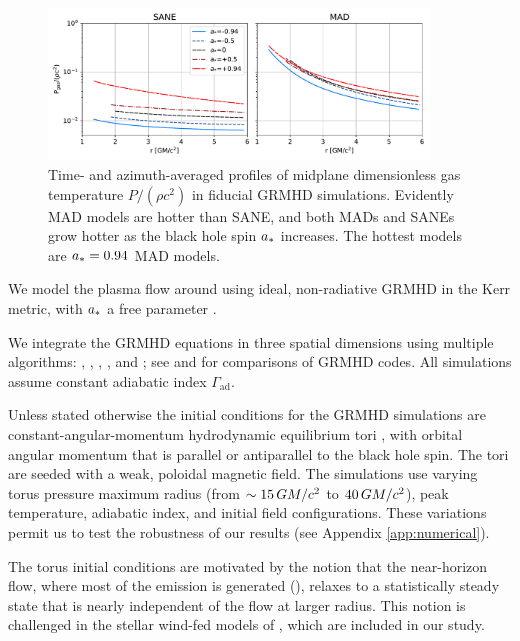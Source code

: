 \begin{figure}
  \centering
  \includegraphics[width=0.9\textwidth]{figures/grmhd_temp.pdf}
  \caption{Time- and azimuth-averaged profiles of midplane dimensionless gas temperature $P/(\rho c^2)$ in \kharma fiducial GRMHD simulations.
    Evidently MAD models are hotter than SANE, and both MADs and SANEs grow hotter as the black hole spin $a_*$ increases.
    The hottest models are $a_* = 0.94$ MAD models.}
  \label{fig:grmhd_temp}
\end{figure}

We model the plasma flow around \sgra using ideal, non-radiative GRMHD in the Kerr metric,
with $a_*$ a free parameter \citep[see e.g.,][]{1999ApJ...522..727K,2001MNRAS.326L..41K,2003ApJ...589..444G, 2003ApJ...589..458D, 2005ApJ...635..723A, 2007A&A...473...11D}.

We integrate the GRMHD equations in three spatial dimensions using multiple algorithms:
\kharma   \citep{2021JOSS....6.3336P},
\bhac     \citep{2017ComAC...4....1P,Olivares2019},
\hamr     \citep{Liska2019},
\koral    \citep{2013MNRAS.429.3533S}, and
\athenapp \citep{2016ApJS..225...22W};
see \citet{2019ApJS..243...26P} and \citet{Olivares_et_al} for comparisons of GRMHD codes.
All simulations assume constant adiabatic index  $\Gamma_\mathrm{ad}$.

Unless stated otherwise the initial conditions for the GRMHD simulations are constant-angular-momentum hydrodynamic equilibrium tori \citep{1976ApJ...207..962F}, with orbital angular momentum that is parallel or antiparallel to the black hole spin.
The tori are seeded with a weak, poloidal magnetic field.  The simulations use varying torus pressure maximum radius
(from $\sim 15\,GM/c^2$ to $40\,GM/c^2$), peak temperature, adiabatic index, and initial field configurations.  These variations permit us to test the robustness of our results (see Appendix \ref{app:numerical}).

The torus initial conditions are motivated by the notion that the near-horizon flow, where most of the emission is generated (), relaxes to a statistically steady state that is nearly independent of the flow at larger radius.
This notion is challenged in the stellar wind-fed models of \cite{2020ApJ...896L...6R}, which are included in our study.


